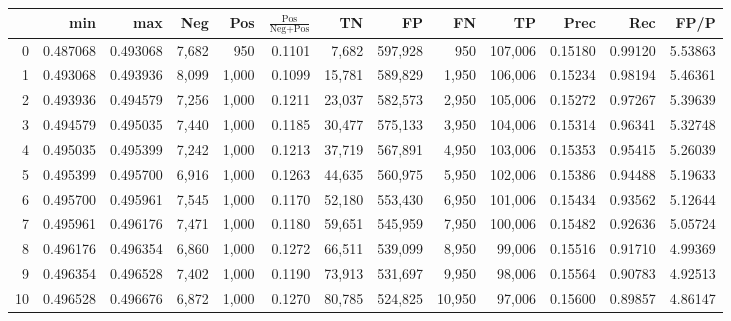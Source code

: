 \begin{tabular}{rrrrrrrrrrrrr}
\toprule
{} &       min &       max &    Neg &    Pos & $\frac{\text{Pos}}{\text{Neg}+\text{Pos}}$ &       TN &       FP &       FN &       TP &     Prec &      Rec &     FP/P \\
\midrule
0   &  0.487068 &  0.493068 &  7,682 &    950 &                                     0.1101 &    7,682 &  597,928 &      950 &  107,006 &  0.15180 &  0.99120 &  5.53863 \\
1   &  0.493068 &  0.493936 &  8,099 &  1,000 &                                     0.1099 &   15,781 &  589,829 &    1,950 &  106,006 &  0.15234 &  0.98194 &  5.46361 \\
2   &  0.493936 &  0.494579 &  7,256 &  1,000 &                                     0.1211 &   23,037 &  582,573 &    2,950 &  105,006 &  0.15272 &  0.97267 &  5.39639 \\
3   &  0.494579 &  0.495035 &  7,440 &  1,000 &                                     0.1185 &   30,477 &  575,133 &    3,950 &  104,006 &  0.15314 &  0.96341 &  5.32748 \\
4   &  0.495035 &  0.495399 &  7,242 &  1,000 &                                     0.1213 &   37,719 &  567,891 &    4,950 &  103,006 &  0.15353 &  0.95415 &  5.26039 \\
5   &  0.495399 &  0.495700 &  6,916 &  1,000 &                                     0.1263 &   44,635 &  560,975 &    5,950 &  102,006 &  0.15386 &  0.94488 &  5.19633 \\
6   &  0.495700 &  0.495961 &  7,545 &  1,000 &                                     0.1170 &   52,180 &  553,430 &    6,950 &  101,006 &  0.15434 &  0.93562 &  5.12644 \\
7   &  0.495961 &  0.496176 &  7,471 &  1,000 &                                     0.1180 &   59,651 &  545,959 &    7,950 &  100,006 &  0.15482 &  0.92636 &  5.05724 \\
8   &  0.496176 &  0.496354 &  6,860 &  1,000 &                                     0.1272 &   66,511 &  539,099 &    8,950 &   99,006 &  0.15516 &  0.91710 &  4.99369 \\
9   &  0.496354 &  0.496528 &  7,402 &  1,000 &                                     0.1190 &   73,913 &  531,697 &    9,950 &   98,006 &  0.15564 &  0.90783 &  4.92513 \\
10  &  0.496528 &  0.496676 &  6,872 &  1,000 &                                     0.1270 &   80,785 &  524,825 &   10,950 &   97,006 &  0.15600 &  0.89857 &  4.86147 \\

\end{tabular}
